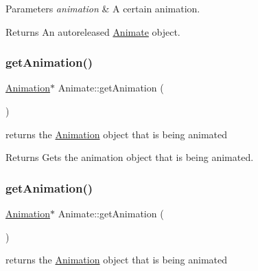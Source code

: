 \begin{DoxyParams}{Parameters}
{\em animation} & A certain animation. \\
\hline
\end{DoxyParams}
\begin{DoxyReturn}{Returns}
An autoreleased \hyperlink{classAnimate}{Animate} object. 
\end{DoxyReturn}
\mbox{\label{classAnimate_aa5a0ca4d90430f3701129e068a4282f6}} 
\subsubsection{\texorpdfstring{get\+Animation()}{getAnimation()}\hspace{0.1cm}{\footnotesize\ttfamily [1/2]}}
{\footnotesize\ttfamily \hyperlink{classAnimation}{Animation}$\ast$ Animate\+::get\+Animation (\begin{DoxyParamCaption}{ }\end{DoxyParamCaption})\hspace{0.3cm}{\ttfamily [inline]}}

returns the \hyperlink{classAnimation}{Animation} object that is being animated

\begin{DoxyReturn}{Returns}
Gets the animation object that is being animated. 
\end{DoxyReturn}
\mbox{\label{classAnimate_aa5a0ca4d90430f3701129e068a4282f6}} 
\subsubsection{\texorpdfstring{get\+Animation()}{getAnimation()}\hspace{0.1cm}{\footnotesize\ttfamily [2/2]}}
{\footnotesize\ttfamily \hyperlink{classAnimation}{Animation}$\ast$ Animate\+::get\+Animation (\begin{DoxyParamCaption}{ }\end{DoxyParamCaption})\hspace{0.3cm}{\ttfamily [inline]}}

returns the \hyperlink{classAnimation}{Animation} object that is being animated

